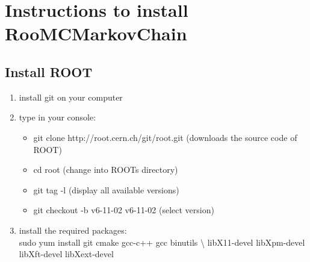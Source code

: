 \documentclass[10pt]{article}
\title{}
\author{Oliver Dahme}
\begin{document}
\maketitle


\section*{Instructions to install RooMCMarkovChain}

\subsection*{Install ROOT}



\begin{enumerate}
  \item install git on your computer \cite{bib:git}
  \item type in your console: \\
  \begin{itemize}
    \item git clone http://root.cern.ch/git/root.git (downloads the source code of ROOT)
    \item cd root (change into ROOTs directory)
    \item git tag -l (display all available versions)
    \item git checkout -b v6-11-02 v6-11-02 (select version)
  \end{itemize}
  \item install the required packages: \\
  sudo yum install git cmake gcc-c++ gcc binutils \textbackslash
libX11-devel libXpm-devel libXft-devel libXext-devel
\end{enumerate}
\end{document}
